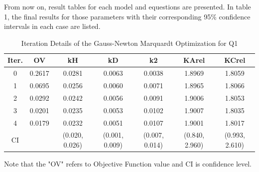 \documentclass[a4paper,12pt]{article} %
\begin{document}
From now on, result tables for each model and equestions are presented. In table 1, the final results for
those parameters with their corresponding 95\% confidence intervals in each case are listed.

\begin{table}[ht]
    \centering
    \begin{tabular}{|c|c|c|c|c|c|c|}
    \hline
Iter. & OV & kH & kD& k2& KArel& KCrel \\ \hline
0 & 0.2617 & 0.0281& 0.0063& 0.0038& 1.8969& 1.8059 \\ \hline
1 & 0.0695 & 0.0256& 0.0060& 0.0071& 1.8965& 1.8066\\ \hline
2 & 0.0292 & 0.0242& 0.0056& 0.0091& 1.9006& 1.8053 \\ \hline
3 & 0.0201 & 0.0235& 0.0053& 0.0102& 1.9007& 1.8035  \\ \hline 
4 & 0.0179 & 0.0232& 0.0051& 0.0107& 1.9001& 1.8017 \\ \hline
CI & &(0.020, 0.026)&(0.001, 0.009)&(0.007, 0.014)& (0.840, 2.960)& (0.993, 2.610)\\ \hline
\end{tabular}
\caption{Iteration Details of the Gauss-Newton Marquardt Optimization for Q1}
\label{tab:iteration_details}
\end{table}
Note that the "OV" refers to Objective Function value and CI is confidence level. 
\end{document}
